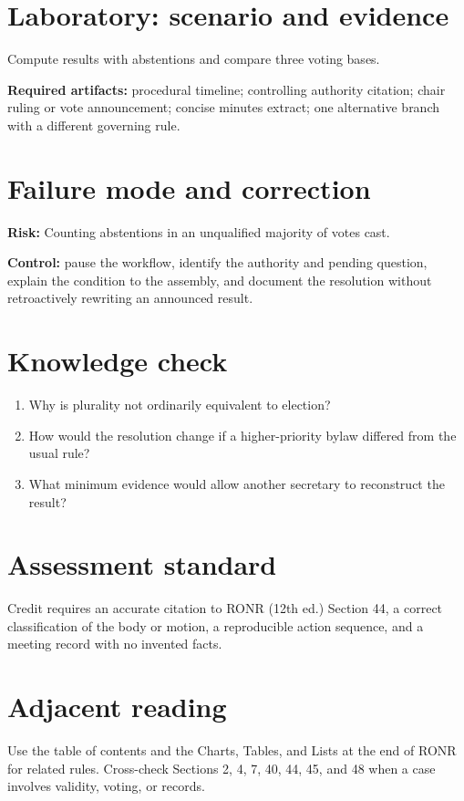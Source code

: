 \documentclass[11pt]{article}
\begin{document}
\section{Laboratory: scenario and evidence}
Compute results with abstentions and compare three voting bases.

\textbf{Required artifacts:} procedural timeline; controlling authority citation; chair ruling or vote announcement; concise minutes extract; one alternative branch with a different governing rule.

\section{Failure mode and correction}
\textbf{Risk:} Counting abstentions in an unqualified majority of votes cast.

\textbf{Control:} pause the workflow, identify the authority and pending question, explain the condition to the assembly, and document the resolution without retroactively rewriting an announced result.

\section{Knowledge check}
\begin{enumerate}[leftmargin=*,itemsep=4pt]
\item Why is plurality not ordinarily equivalent to election?
\item How would the resolution change if a higher-priority bylaw differed from the usual rule?
\item What minimum evidence would allow another secretary to reconstruct the result?
\end{enumerate}

\section{Assessment standard}
Credit requires an accurate citation to RONR (12th ed.) Section 44, a correct classification of the body or motion, a reproducible action sequence, and a meeting record with no invented facts.

\section{Adjacent reading}
Use the table of contents and the Charts, Tables, and Lists at the end of RONR for related rules. Cross-check Sections 2, 4, 7, 40, 44, 45, and 48 when a case involves validity, voting, or records.
\end{document}
